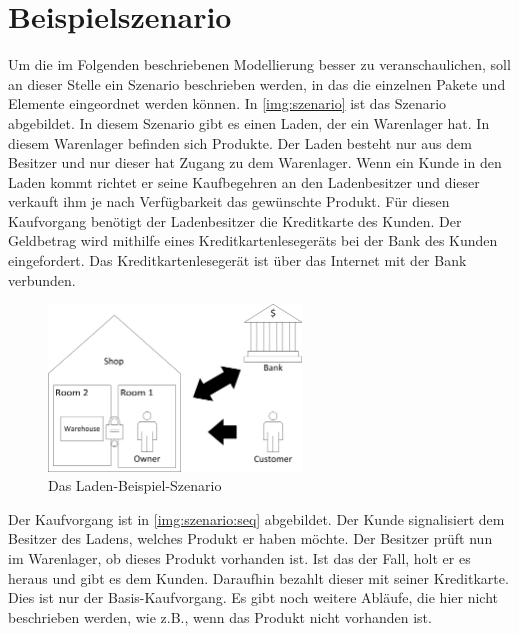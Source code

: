\section{Beispielszenario}
\label{sec:szenario}
Um die im Folgenden beschriebenen Modellierung besser zu veranschaulichen, soll an dieser Stelle ein Szenario beschrieben werden, in das die einzelnen Pakete und Elemente eingeordnet werden können. In \autoref{img:szenario} ist das Szenario abgebildet. In diesem Szenario gibt es einen Laden, der ein Warenlager hat. In diesem Warenlager befinden sich Produkte. Der Laden besteht nur aus dem Besitzer und nur dieser hat Zugang zu dem Warenlager. Wenn ein Kunde in den Laden kommt richtet er seine Kaufbegehren an den Ladenbesitzer und dieser verkauft ihm je nach Verfügbarkeit das gewünschte Produkt. Für diesen Kaufvorgang benötigt der Ladenbesitzer die Kreditkarte des Kunden. Der Geldbetrag wird mithilfe eines Kreditkartenlesegeräts bei der Bank des Kunden eingefordert. Das Kreditkartenlesegerät ist über das Internet mit der Bank verbunden.

\begin{figure}[h]
	\centering
  	\includegraphics[width=0.6\textwidth]{images/szenario.png}
	\caption{Das Laden-Beispiel-Szenario}
	\label{img:szenario}
\end{figure}

Der Kaufvorgang ist in \autoref{img:szenario:seq} abgebildet. Der Kunde signalisiert dem Besitzer des Ladens, welches Produkt er haben möchte. Der Besitzer prüft nun im Warenlager, ob dieses Produkt vorhanden ist. Ist das der Fall, holt er es heraus und gibt es dem Kunden. Daraufhin bezahlt dieser mit seiner Kreditkarte. Dies ist nur der Basis-Kaufvorgang. Es gibt noch weitere Abläufe, die hier nicht beschrieben werden, wie z.B., wenn das Produkt nicht vorhanden ist.

